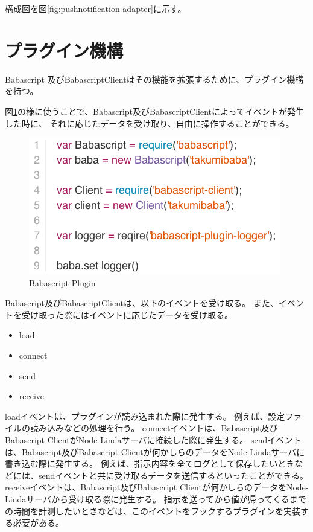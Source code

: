 構成図を図\ref{fig:pushnotification-adapter}に示す。

\section{プラグイン機構}\label{ux30d7ux30e9ux30b0ux30a4ux30f3ux6a5fux69cb}

Babascript
及びBabascriptClientはその機能を拡張するために、プラグイン機構を持つ。

図\ref{fig:babascript_plugin}の様に使うことで、Babascript及びBabascriptClientによってイベントが発生した時に、
それに応じたデータを受け取り、自由に操作することができる。

\begin{figure}[htbp]
  \begin{center}
  \includegraphics[width=.7\linewidth,bb=0 0 416 226]{images/babascript_plugin.js.png}
  \end{center}
  \caption{Babascript Plugin}
  \label{fig:babascript_plugin}
\end{figure}

Babascript及びBabascriptClientは、以下のイベントを受け取る。
また、イベントを受け取った際にはイベントに応じたデータを受け取る。

\begin{itemize}
\itemsep1pt\parskip0pt
\item
  load
\item
  connect
\item
  send
\item
  receive
\end{itemize}

loadイベントは、プラグインが読み込まれた際に発生する。
例えば、設定ファイルの読み込みなどの処理を行う。
connectイベントは、Babascript及びBabascript
ClientがNode-Lindaサーバに接続した際に発生する。
sendイベントは、Babascript及びBabascript
Clientが何かしらのデータをNode-Lindaサーバに書き込む際に発生する。
例えば、指示内容を全てログとして保存したいときなどには、sendイベントと共に受け取るデータを送信するといったことができる。
receiveイベントは、Babascript及びBabascript
Clientが何かしらのデータをNode-Lindaサーバから受け取る際に発生する。
指示を送ってから値が帰ってくるまでの時間を計測したいときなどは、このイベントをフックするプラグインを実装する必要がある。

